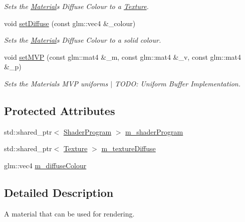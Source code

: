 \begin{DoxyCompactItemize}
\begin{DoxyCompactList}\small\item\em Sets the \hyperlink{class_cookie_eng_1_1_resources_1_1_material}{Material}\textquotesingle{}s Diffuse Colour to a \hyperlink{class_cookie_eng_1_1_resources_1_1_texture}{Texture}. \end{DoxyCompactList}\item 
void \hyperlink{class_cookie_eng_1_1_resources_1_1_material_abd2e0f6b5a0ea9987cc545859d8cc14e}{set\+Diffuse} (const glm\+::vec4 \&\+\_\+colour)
\begin{DoxyCompactList}\small\item\em Sets the \hyperlink{class_cookie_eng_1_1_resources_1_1_material}{Material}\textquotesingle{}s Diffuse Colour to a solid colour. \end{DoxyCompactList}\item 
void \hyperlink{class_cookie_eng_1_1_resources_1_1_material_a68279187d2c08bd49a7ee1994c1f2c5d}{set\+M\+VP} (const glm\+::mat4 \&\+\_\+m, const glm\+::mat4 \&\+\_\+v, const glm\+::mat4 \&\+\_\+p)
\begin{DoxyCompactList}\small\item\em Sets the Materials M\+VP uniforms $\vert$ T\+O\+DO\+: Uniform Buffer Implementation. \end{DoxyCompactList}\end{DoxyCompactItemize}
\subsection*{Protected Attributes}
\begin{DoxyCompactItemize}
\item 
std\+::shared\+\_\+ptr$<$ \hyperlink{class_cookie_eng_1_1_resources_1_1_shader_program}{Shader\+Program} $>$ \hyperlink{class_cookie_eng_1_1_resources_1_1_material_acb45c40912ababa7776c666af13b1f3f}{m\+\_\+shader\+Program}
\item 
std\+::shared\+\_\+ptr$<$ \hyperlink{class_cookie_eng_1_1_resources_1_1_texture}{Texture} $>$ \hyperlink{class_cookie_eng_1_1_resources_1_1_material_adf7fcbb59dcfbad47d48052522414791}{m\+\_\+texture\+Diffuse}
\item 
glm\+::vec4 \hyperlink{class_cookie_eng_1_1_resources_1_1_material_abbf6212e6e8c5e341f20628cd2c3aea2}{m\+\_\+diffuse\+Colour}
\end{DoxyCompactItemize}


\subsection{Detailed Description}
A material that can be used for rendering. 


